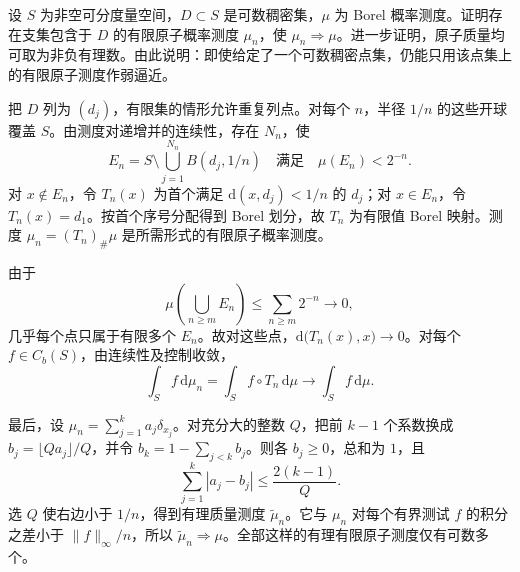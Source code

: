 \begin{exercise}\label{b1:ex:12-atomic-approximation}
设 \(S\) 为非空可分度量空间，\(D\subset S\) 是可数稠密集，\(\mu\) 为 Borel 概率测度。证明存在支集包含于 \(D\) 的有限原子概率测度 \(\mu_n\)，使 \(\mu_n\Rightarrow\mu\)。进一步证明，原子质量均可取为非负有理数。由此说明：即使给定了一个可数稠密点集，仍能只用该点集上的有限原子测度作弱逼近。
\end{exercise}
\begin{solution}
把 \(D\) 列为 \((d_j)\)，有限集的情形允许重复列点。对每个 \(n\)，半径 \(1/n\) 的这些开球覆盖 \(S\)。由测度对递增并的连续性，存在 \(N_n\)，使
\[
 E_n=S\setminus\bigcup_{j=1}^{N_n}B(d_j,1/n)
 \quad\text{满足}\quad\mu(E_n)<2^{-n}.
\]
对 \(x\notin E_n\)，令 \(T_n(x)\) 为首个满足 \(\mathrm{d}(x,d_j)<1/n\) 的 \(d_j\)；对 \(x\in E_n\)，令 \(T_n(x)=d_1\)。按首个序号分配得到 Borel 划分，故 \(T_n\) 为有限值 Borel 映射。测度 \(\mu_n=(T_n)_\#\mu\) 是所需形式的有限原子概率测度。

由于
\[
 \mu\left(\bigcup_{n\ge m}E_n\right)\le\sum_{n\ge m}2^{-n}\longrightarrow0,
\]
几乎每个点只属于有限多个 \(E_n\)。故对这些点，\(\mathrm{d}\bigl(T_n(x),x\bigr)\rightarrow0\)。对每个 \(f\in C_b(S)\)，由连续性及控制收敛，
\[
 \int_Sf\,\mathrm d\mu_n
 =\int_Sf\circ T_n\,\mathrm d\mu
 \longrightarrow\int_Sf\,\mathrm d\mu.
\]

最后，设 \(\mu_n=\sum_{j=1}^ka_j\delta_{x_j}\)。对充分大的整数 \(Q\)，把前 \(k-1\) 个系数换成 \(b_j=\lfloor Qa_j\rfloor/Q\)，并令 \(b_k=1-\sum_{j<k}b_j\)。则各 \(b_j\ge0\)，总和为 \(1\)，且
\[
 \sum_{j=1}^k|a_j-b_j|\le\frac{2(k-1)}Q.
\]
选 \(Q\) 使右边小于 \(1/n\)，得到有理质量测度 \(\widetilde\mu_n\)。它与 \(\mu_n\) 对每个有界测试 \(f\) 的积分之差小于 \(\|f\|_\infty/n\)，所以 \(\widetilde\mu_n\Rightarrow\mu\)。全部这样的有理有限原子测度仅有可数多个。
\end{solution}

